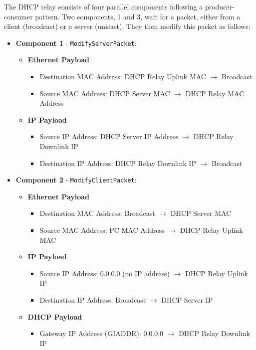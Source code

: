 The DHCP relay consists of four parallel components following a producer-consumer pattern. Two components, 1 and 3, wait for a packet, either from a client (broadcast) or a server (unicast). They then modify this packet as follows:
\begin{itemize}
	\item \textbf{Component 1} - \texttt{ModifyServerPacket}:
	\begin{itemize}
		\item \textbf{Ethernet Payload}
		\begin{itemize}
			\item Destination MAC Address: DHCP Relay Uplink MAC $\to$ Broadcast
			\item Source MAC Address: DHCP Server MAC $\to$ DHCP Relay MAC Address
		\end{itemize} 
			\item \textbf{IP Payload}
		\begin{itemize}
			\item Source IP Address: DHCP Server IP Address $\to$ DHCP Relay Downlink IP
			\item Destination IP Address: DHCP Relay Downlink IP $\to$ Broadcast
		\end{itemize}	
	\end{itemize}
	\item \textbf{Component 2} - \texttt{ModifyClientPacket}:
	\begin{itemize}
		\item \textbf{Ethernet Payload}
		\begin{itemize}
			\item Destination MAC Address: Broadcast $\to$ DHCP Server MAC
			\item Source MAC Address: PC MAC Address $\to$ DHCP Relay Uplink MAC 
		\end{itemize}
		\item \textbf{IP Payload}
		\begin{itemize}
			\item Source IP Address: 0.0.0.0 (no IP address) $\to$ DHCP Relay Uplink IP
			\item Destination IP Address: Broadcast $\to$ DHCP Server IP
		\end{itemize}
		\item \textbf{DHCP Payload}
		\begin{itemize}
			\item Gateway IP Address (GIADDR): 0.0.0.0 $\to$ DHCP Relay Downlink IP
		\end{itemize}
	\end{itemize}
\end{itemize}

